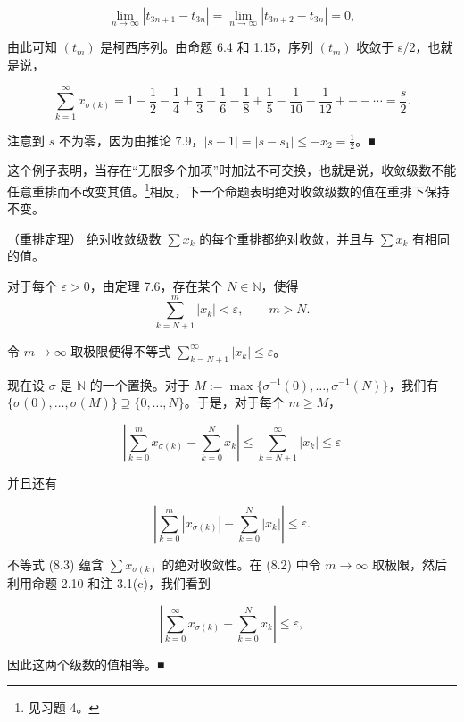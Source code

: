 \begin{example}
\[
\lim_{n\to\infty}\left|t_{3n+1}-t_{3n}\right|=\lim_{n\to\infty}\left|t_{3n+2}-t_{3n}\right|=0,
\]

由此可知 $ (t_{m}) $ 是柯西序列。由命题 6.4 和 1.15，序列 $ (t_{m}) $ 收敛于 s/2，也就是说，

\[
\sum_{k=1}^{\infty}x_{\sigma(k)}=1-\frac{1}{2}-\frac{1}{4}+\frac{1}{3}-\frac{1}{6}-\frac{1}{8}+\frac{1}{5}-\frac{1}{10}-\frac{1}{12}+--\cdots=\frac{s}{2}.
\]

注意到 $s$ 不为零，因为由推论 7.9，$|s-1|=|s-s_1|\leq-x_2=\frac{1}{2}$。■

这个例子表明，当存在“无限多个加项”时加法不可交换，也就是说，收敛级数不能任意重排而不改变其值。\footnote{见习题 4。}相反，下一个命题表明绝对收敛级数的值在重排下保持不变。

\end{example}

\begin{theorem}

（重排定理） 绝对收敛级数 $ \sum x_k $ 的每个重排都绝对收敛，并且与 $ \sum x_k $ 有相同的值。

\proofhead
对于每个 $ \varepsilon > 0 $，由定理 7.6，存在某个 $ N \in \mathbb{N} $，使得
\[
\sum_{k=N+1}^{m}\left|x_{k}\right|<\varepsilon,\qquad m>N.
\]

令 $ m \to \infty $ 取极限便得不等式 $ \sum_{k=N+1}^{\infty} |x_k| \leq \varepsilon $。

现在设 $ \sigma $ 是 $ \mathbb{N} $ 的一个置换。对于 $ M := \max\{\sigma^{-1}(0), \ldots, \sigma^{-1}(N)\} $，我们有 $ \{\sigma(0), \ldots, \sigma(M)\} \supseteq \{0, \ldots, N\} $。于是，对于每个 $ m \geq M $，

\begin{equation}
\left|\sum_{k=0}^{m}x_{\sigma(k)}-\sum_{k=0}^{N}x_{k}\right|\leq\sum_{k=N+1}^{\infty}\left|x_{k}\right|\leq\varepsilon
\end{equation}

并且还有

\begin{equation}
\left|\sum_{k=0}^{m}\left|x_{\sigma(k)}\right|-\sum_{k=0}^{N}\left|x_{k}\right|\right|\leq\varepsilon.
\end{equation}

不等式 (8.3) 蕴含 $ \sum x_{\sigma(k)} $ 的绝对收敛性。在 (8.2) 中令 $ m \to \infty $ 取极限，然后利用命题 2.10 和注 3.1(c)，我们看到

\[
\left|\sum_{k=0}^{\infty}x_{\sigma(k)}-\sum_{k=0}^{N}x_{k}\right|\leq\varepsilon,
\]

因此这两个级数的值相等。■

\end{theorem}

